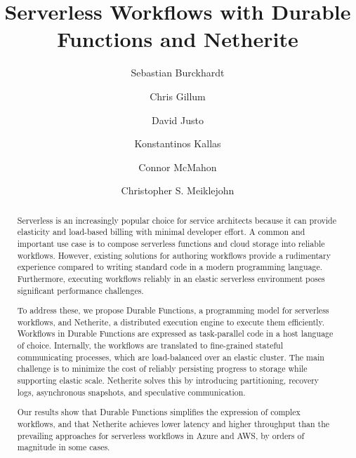 \documentclass[sigplan,nonacm]{acmart}
\title{Serverless Workflows with Durable Functions and Netherite}
\author{Sebastian Burckhardt}
\affiliation{Microsoft Research}
\author{Chris Gillum}
\affiliation{Microsoft Azure}
\author{David Justo}
\affiliation{Microsoft Azure}
\author{Konstantinos Kallas}
\affiliation{University of Pennsylvania}
\author{Connor McMahon}
\affiliation{Microsoft Azure}
\author{Christopher S. Meiklejohn}
\affiliation{Carnegie Mellon University}
\begin{document}
\begin{abstract}
Serverless is an increasingly popular choice for service architects because it can provide elasticity and load-based billing with minimal developer effort. A common and important use case is to compose serverless functions and cloud storage into reliable workflows. However, existing solutions for authoring workflows provide a rudimentary experience compared to writing standard code in a modern programming language. Furthermore, executing workflows reliably in an elastic serverless environment poses significant performance challenges.

To address these, we propose Durable Functions, a programming model for serverless workflows, and Netherite, a distributed execution engine to execute them efficiently. Workflows in Durable Functions are expressed as task-parallel code in a host language of choice. Internally, the workflows are translated to fine-grained stateful communicating processes, which are load-balanced over an elastic cluster. The main challenge is to minimize the cost of reliably persisting progress to storage while supporting elastic scale. Netherite solves this by introducing partitioning, recovery logs, asynchronous snapshots, and speculative communication. 
 
Our results show that Durable Functions simplifies the expression of complex workflows, and that Netherite achieves lower latency and higher throughput than the prevailing approaches for serverless workflows in Azure and AWS, by orders of magnitude in some cases.
\end{abstract}
\maketitle












\end{document}
